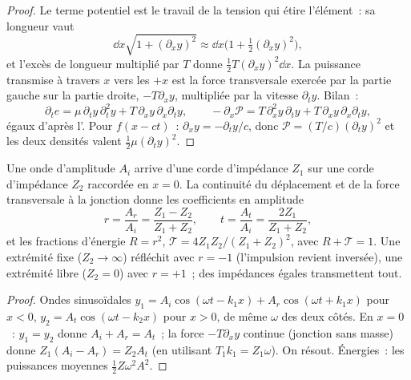 \begin{proof}
Le terme potentiel est le travail de la tension qui étire l'élément~:
sa longueur vaut
\[
\dd x\sqrt{1 + (\partial_xy)^2} \approx \dd x\bigl(1 + \tfrac12(\partial_xy)^2\bigr) ,
\]
et l'excès de longueur multiplié par $T$ donne $\tfrac12T(\partial_xy)^2\dd x$. La puissance
transmise à travers $x$ vers les $+x$ est la force transversale exercée par
la partie gauche sur la partie droite, $-T\partial_xy$, multipliée par la vitesse
$\partial_ty$. Bilan~:
\[
\partial_te = \mu\,\partial_ty\,\partial_t^2y + T\,\partial_xy\,\partial_x\partial_ty ,
\qquad
-\partial_x\mathcal P = T\,\partial_x^2y\,\partial_ty + T\,\partial_xy\,\partial_x\partial_ty ,
\]
égaux d'après l'. Pour $f(x - ct)$~: $\partial_xy = -\partial_ty/c$, donc $\mathcal P = (T/c)
(\partial_ty)^2$ et les deux densités valent $\tfrac12\mu(\partial_ty)^2$.
\end{proof}

\begin{proposition}\label{prop:b2:waves-on-strings:junction}
Une onde d'amplitude $A_i$ arrive d'une corde d'impédance $Z_1$ sur
une corde d'impédance $Z_2$ raccordée en $x = 0$. La continuité du
déplacement et de la force transversale à la jonction donne les
coefficients en amplitude
\[
r = \frac{A_r}{A_i} = \frac{Z_1 - Z_2}{Z_1 + Z_2} , \qquad
t = \frac{A_t}{A_i} = \frac{2Z_1}{Z_1 + Z_2} ,
\]
et les fractions d'énergie $R = r^2$, $\mathcal T = 4Z_1Z_2/(Z_1 + Z_2)^2$, avec
$R + \mathcal T = 1$. Une extrémité fixe ($Z_2 \to \infty$) réfléchit avec $r = -1$
(l'impulsion revient inversée), une extrémité libre ($Z_2 = 0$) avec $r = +1$~;
des impédances égales transmettent tout.
\end{proposition}

\begin{proof}
Ondes sinusoïdales $y_1 = A_i\cos(\omega t - k_1x) + A_r\cos(\omega t + k_1x)$ pour
$x < 0$, $y_2 = A_t\cos(\omega t - k_2x)$ pour $x > 0$, de même $\omega$ des deux
côtés. En $x = 0$~: $y_1 = y_2$ donne $A_i + A_r = A_t$~; la force $-T\partial_xy$
continue (jonction sans masse) donne $Z_1(A_i - A_r) = Z_2A_t$ (en utilisant
$T_1k_1 = Z_1\omega$). On résout. Énergies~: les puissances moyennes $\tfrac12Z\omega^2A^2$.
\end{proof}

